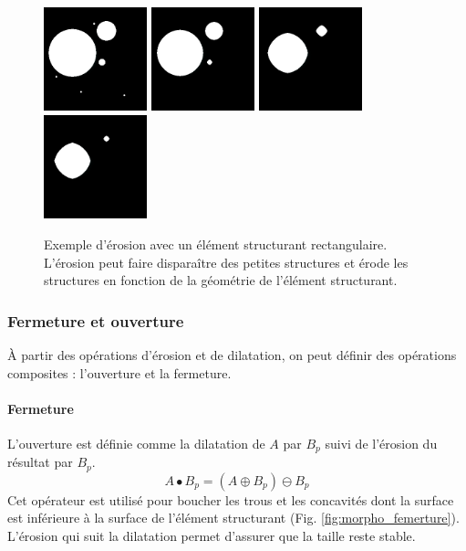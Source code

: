   \begin{figure}[h]
    \centering
    \includegraphics[height=3cm]{Images/morpho_init.png}
    \includegraphics[height=3cm]{Images/morpho_erode_k5.png}
    \includegraphics[height=3cm]{Images/morpho_erode_k21.png}
    \includegraphics[height=3cm]{Images/morpho_erode_k31.png}
    \caption{Exemple d'érosion avec un élément structurant rectangulaire. L'érosion peut faire disparaître des petites structures et érode les structures en fonction de la géométrie de l'élément structurant.}
    \label{fig:morpho_erosion}
  \end{figure}
  
  \subsubsection{Fermeture et ouverture}
  À partir des opérations d'érosion et de dilatation, on peut définir des opérations composites : l'ouverture et la fermeture.
  \paragraph{Fermeture}
  L'ouverture est définie comme la dilatation de $A$ par $B_p$ suivi de l'érosion du résultat par $B_p$.
  \begin{equation}
   A \bullet B_p = (A \oplus B_p) \ominus B_p
  \end{equation}  
  Cet opérateur est utilisé pour boucher les trous et les concavités dont la surface est inférieure à la surface de l'élément structurant (Fig. \ref{fig:morpho_femerture}). L'érosion qui suit la dilatation permet d'assurer que la taille reste stable.
  
